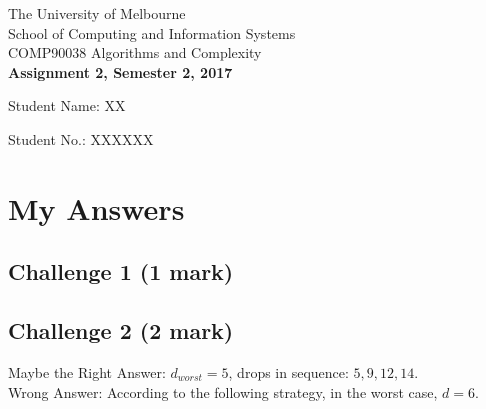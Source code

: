\documentclass[11pt]{article}
\begin{document}
\begin{center}
{\sc The University of Melbourne
\\
School of Computing and Information Systems
\\
COMP90038 Algorithms and Complexity}
\bigskip \\
{\Large\bf Assignment 2, Semester 2, 2017}
\bigskip \\
{Student Name: XX

Student No.: XXXXXX}
\end{center}
\section*{My Answers}
\subsection*{Challenge 1 \hfill {\small (1 mark)}}
\begin{center}
\end{center}

\subsection*{Challenge 2 \hfill {\small (2 mark)}}
Maybe the Right Answer: $d_{\mathit{worst}} = 5$, drops in sequence: $5, 9, 12, 14$.
\\
Wrong Answer:
According to the following strategy, in the worst case, $d = 6$.
\end{document}
